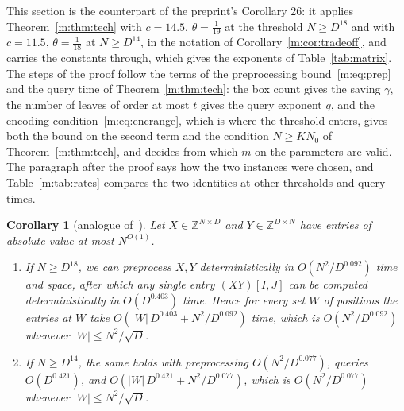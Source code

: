 \documentclass[11pt]{article}
\newtheorem{corollary}[theorem]{Corollary}
\theoremstyle{definition}
\theoremstyle{remark}
\newcommand{\Z}{\mathbb{Z}}
\newcommand{\Nz}{N_0}
\begin{document}
This section is the counterpart of the preprint's Corollary 26: it applies Theorem~\ref{m:thm:tech} with $c=14.5$, $\theta=\frac1{19}$ at the threshold $N\ge D^{18}$ and with $c=11.5$, $\theta=\frac1{18}$ at $N\ge D^{14}$, in the notation of Corollary~\ref{m:cor:tradeoff}, and carries the constants through, which gives the exponents of Table~\ref{tab:matrix}. The steps of the proof follow the terms of the preprocessing bound~\eqref{m:eq:prep} and the query time of Theorem~\ref{m:thm:tech}: the box count gives the saving $\gamma$, the number of leaves of order at most $t$ gives the query exponent $q$, and the encoding condition~\eqref{m:eq:encrange}, which is where the threshold enters, gives both the bound on the second term and the condition $N\ge K\Nz$ of Theorem~\ref{m:thm:tech}, and decides from which $m$ on the parameters are valid. The paragraph after the proof says how the two instances were chosen, and Table~\ref{m:tab:rates} compares the two identities at other thresholds and query times.

\begin{corollary}[analogue of~{\cite[Corollary 26]{ZT}}]\label{m:cor:explicit}
Let $X\in\Z^{N\times D}$ and $Y\in\Z^{D\times N}$ have entries of absolute value at most $N^{O(1)}$.
\begin{enumerate}[label=(\alph*),nosep]
\item If $N\ge D^{18}$, we can preprocess $X,Y$ deterministically in $O(N^2/D^{0.092})$ time and space, after which any single entry $(XY)[I,J]$ can be computed deterministically in $O(D^{0.403})$ time. Hence for every set $W$ of positions the entries at $W$ take $O(|W|\,D^{0.403}+N^2/D^{0.092})$ time, which is $O(N^2/D^{0.092})$ whenever $|W|\le N^2/\sqrt D$.
\item If $N\ge D^{14}$, the same holds with preprocessing $O(N^2/D^{0.077})$, queries $O(D^{0.421})$, and $O(|W|\,D^{0.421}+N^2/D^{0.077})$, which is $O(N^2/D^{0.077})$ whenever $|W|\le N^2/\sqrt D$.
\end{enumerate}
\end{corollary}
\end{document}
